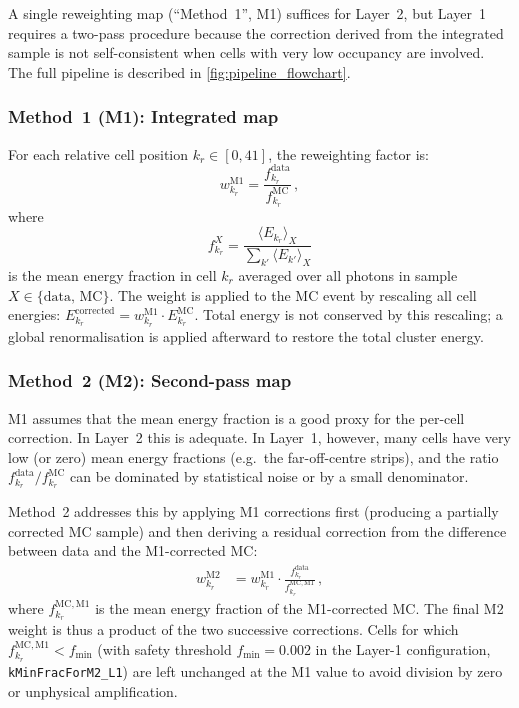 \documentclass[11pt,a4paper]{article}
\begin{document}
A single reweighting map (``Method~1'', M1) suffices for Layer~2,
but Layer~1 requires a two-pass procedure because the correction
derived from the integrated sample is not self-consistent when cells
with very low occupancy are involved.  The full pipeline is described
in \cref{fig:pipeline_flowchart}.

\subsubsection{Method~1 (M1): Integrated map}
\label{sec:method:m1}

For each relative cell position $k_r \in [0, 41]$, the reweighting
factor is:
\begin{equation}
  w_{k_r}^\mathrm{M1} =
    \frac{f_{k_r}^\mathrm{data}}{f_{k_r}^\mathrm{MC}}\,,
  \label{eq:m1}
\end{equation}
where
\begin{equation}
  f_{k_r}^X = \frac{\langle E_{k_r} \rangle_X}
                    {\sum_{k'} \langle E_{k'} \rangle_X}
  \label{eq:frac}
\end{equation}
is the mean energy fraction in cell $k_r$ averaged over all photons
in sample $X \in \{\text{data, MC}\}$.  The weight is applied to
the MC event by rescaling all cell energies:
$E_{k_r}^\mathrm{corrected} = w_{k_r}^\mathrm{M1} \cdot E_{k_r}^\mathrm{MC}$.
Total energy is not conserved by this rescaling; a global
renormalisation is applied afterward to restore the total cluster
energy.

\subsubsection{Method~2 (M2): Second-pass map}
\label{sec:method:m2}

M1 assumes that the mean energy fraction is a good proxy for
the per-cell correction.  In Layer~2 this is adequate.  In Layer~1,
however, many cells have very low (or zero) mean energy fractions
(e.g.\ the far-off-centre strips), and the ratio
$f_{k_r}^\mathrm{data} / f_{k_r}^\mathrm{MC}$ can be dominated
by statistical noise or by a small denominator.

Method~2 addresses this by applying M1 corrections first (producing
a partially corrected MC sample) and then deriving a residual
correction from the difference between data and the M1-corrected MC:
\begin{align}
  w_{k_r}^\mathrm{M2} &=
    w_{k_r}^\mathrm{M1} \cdot
    \frac{f_{k_r}^\mathrm{data}}{f_{k_r}^{\mathrm{MC, M1}}}\,,
  \label{eq:m2}
\end{align}
where $f_{k_r}^{\mathrm{MC, M1}}$ is the mean energy fraction of
the M1-corrected MC.  The final M2 weight is thus a product of the
two successive corrections.  Cells for which
$f_{k_r}^{\mathrm{MC, M1}} < f_\mathrm{min}$ (with safety threshold
$f_\mathrm{min} = 0.002$ in the Layer-1 configuration,
\texttt{kMinFracForM2\_L1}) are left unchanged at the M1 value
to avoid division by zero or unphysical amplification.
\end{document}
